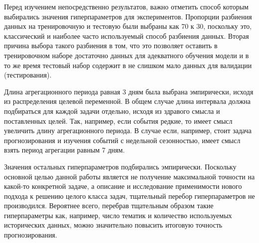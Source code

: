 Перед изучением непосредственно результатов, важно отметить способ которым выбирались значения гиперпараметров для экспериментов. Пропорции разбиения данных на тренировочную и тестовую были выбраны как 70 к 30, поскольку это,  классический и наиболее часто используемый способ разбиения данных. Вторая причина выбора такого разбиения в том, что это позволяет оставить в тренировочном наборе достаточно данных для адекватного обучения модели и в то же время тестовый набор содержит в не слишком мало данных для валидации (тестирования). 

Длина агрегационного периода равная 3 дням была выбрана эмпирически, исходя из распределения целевой переменной. В общем случае длина интервала должна подбираться для каждой задачи отдельно, исходя из здравого смысла и поставленных целей. Так, например, если события редкие, то имеет смысл увеличить длину агрегационного периода. В случае если, например, стоит задача прогнозирования и изучения событий с недельной сезонностью, имеет смысл взять период агрегации равным 7 дням. 

Значения остальных гиперпараметров подбирались эмпирически. Поскольку основной целью данной работы является не получение максимальной точности на какой-то конкретной задаче, а описание и исследование применимости нового подхода к решению целого класса задач, тщательный перебор гиперпараметров не производился. Вероятнее всего, перебрав тщательным образом такие гиперпараметры как, например, число тематик и количество используемых исторических данных, можно значительно повысить итоговую точность прогнозирования.

